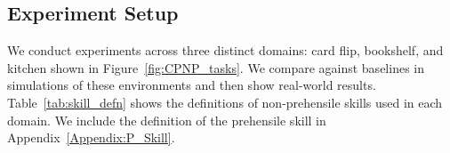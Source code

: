 \subsection{Experiment Setup}
We conduct experiments across three distinct domains: card flip, bookshelf, and kitchen shown in Figure~\ref{fig:CPNP_tasks}. We compare against baselines in simulations of these environments and then show real-world results. Table~\ref{tab:skill_defn} shows the definitions of non-prehensile skills used in each domain. We include the definition of the prehensile skill in Appendix~\ref{Appendix:P_Skill}. 
